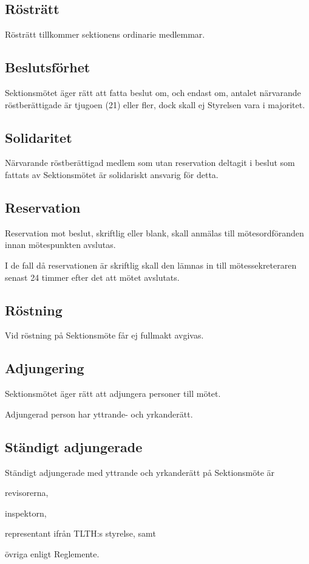 \documentclass[10pt]{article}
\begin{document}
\subsection{Rösträtt}
Rösträtt tillkommer sektionens ordinarie medlemmar.

\subsection{Beslutsförhet}
Sektionsmötet äger rätt att fatta beslut om, och endast om, antalet
närvarande röstberättigade är tjugoen (21) eller fler, dock skall ej Styrelsen
vara i majoritet.

\subsection{Solidaritet}
Närvarande röstberättigad medlem som utan reservation deltagit i beslut som
fattats av Sektionsmötet är solidariskt ansvarig för detta.

\subsection{Reservation}
Reservation mot beslut, skriftlig eller blank, skall anmälas till
mötesordföranden innan mötespunkten avslutas.

I de fall då reservationen är skriftlig skall den lämnas in till
mötessekreteraren senast 24 timmer efter det att mötet avslutats.

\subsection{Röstning}
Vid röstning på Sektionsmöte får ej fullmakt avgivas.

\subsection{Adjungering}
Sektionsmötet äger rätt att adjungera personer till mötet.

Adjungerad person har yttrande- och yrkanderätt.

\subsection{Ständigt adjungerade}
Ständigt adjungerade med yttrande och yrkanderätt på
Sektionsmöte är
\begin{alphlist}
\item 	revisorerna,
\item 	inspektorn,
\item 	representant ifrån TLTH:s styrelse, samt
\item 	övriga enligt Reglemente.
\end{alphlist}
\end{document}
